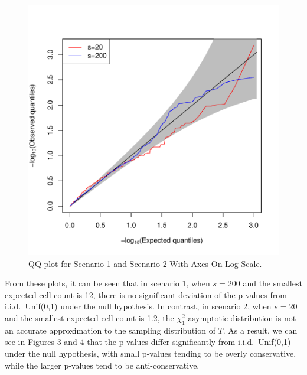 \documentclass[article]{jss}
\begin{document}
\begin{figure}
\begin{center}
\includegraphics{manuscript-chisq_qq_log}
\end{center}
\caption{QQ plot for Scenario 1 and Scenario 2 With Axes On Log Scale.}
\end{figure}

From these plots, it can be seen that in scenario 1, when $s=200$ and the smallest expected cell count is 12, there is no significant deviation of the p-values from i.i.d.\ Unif(0,1) under the null hypothesis.  In contrast, in scenario 2, when $s=20$ and the smallest expected cell count is 1.2, the $\chi^2_1$ asymptotic distribution is not an accurate approximation to the sampling distribution of $T$.  As a result, we can see in Figures 3 and 4 that the p-values differ significantly from i.i.d.\ Unif(0,1) under the null hypothesis, with small p-values tending to be overly conservative, while the larger p-values tend to be anti-conservative.
\end{document}
